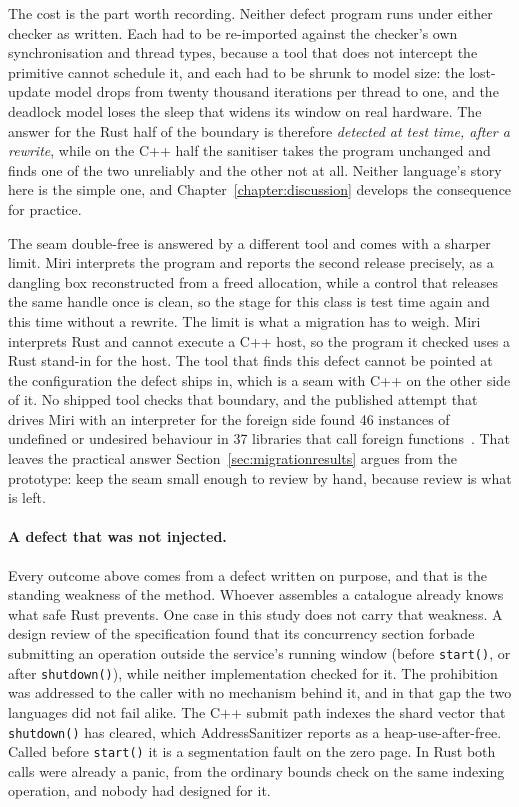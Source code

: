 \documentclass[english,oneside,a4paper,censored,csm,software-track-2020]{HYthesisML}
\begin{document}
The cost is the part worth recording. Neither defect program runs under either checker as
written. Each had to be re-imported against the checker's own synchronisation and thread types,
because a tool that does not intercept the primitive cannot schedule it, and each had to be
shrunk to model size: the lost-update model drops from twenty thousand iterations per thread to
one, and the deadlock model loses the sleep that widens its window on real hardware. The answer
for the Rust half of the boundary is therefore \emph{detected at test time, after a rewrite},
while on the C++ half the sanitiser takes the program unchanged and finds one of the two
unreliably and the other not at all. Neither language's story here is the simple one, and
Chapter~\ref{chapter:discussion} develops the consequence for practice.

The seam double-free is answered by a different tool and comes with a sharper limit. Miri
interprets the program and reports the second
release precisely, as a dangling box reconstructed from a freed allocation, while a control that
releases the same handle once is clean, so the stage for this class is test time again and this
time without a rewrite. The limit is what a migration has to weigh. Miri interprets Rust and
cannot execute a C++ host, so the program it checked uses a Rust stand-in for the host. The tool
that finds this defect cannot be pointed at the configuration the defect ships in, which is a
seam with C++ on the other side of it. No shipped tool checks that boundary, and the published
attempt that drives Miri with an interpreter for the foreign side found 46 instances of
undefined or undesired behaviour in 37 libraries that call foreign
functions~\cite{mccormack2025ffi}. That leaves the practical answer
Section~\ref{sec:migrationresults} argues from the prototype: keep
the seam small enough to review by hand, because review is what is left.

\paragraph{A defect that was not injected.}
Every outcome above comes from a defect written on purpose, and that is the standing weakness of
the method. Whoever assembles a catalogue already knows what safe Rust prevents. One case in
this study does not carry that weakness. A design review of the specification found that its
concurrency section forbade submitting an operation outside the service's running window
(before \texttt{start()}, or after \texttt{shutdown()}), while neither implementation checked
for it. The prohibition was addressed to the caller with no mechanism behind it, and in that gap
the two languages did not fail alike. The C++ submit path indexes the shard vector that
\texttt{shutdown()} has cleared, which AddressSanitizer reports as a heap-use-after-free. Called
before \texttt{start()} it is a segmentation fault on the zero page. In Rust both calls were
already a panic, from the ordinary bounds check on the same indexing operation, and nobody had
designed for it.
\end{document}
